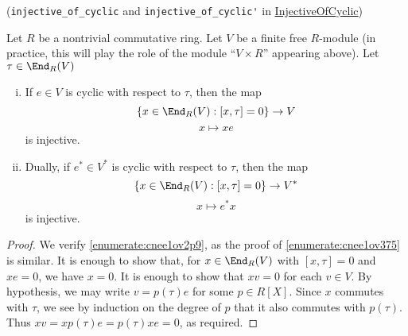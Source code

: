 \documentclass[reqno]{amsart} 
\begin{document}
\begin{lemma}
  (\verb|injective_of_cyclic| and \verb|injective_of_cyclic'| in \href{InjectiveOfCyclic.lean}{InjectiveOfCyclic})

  Let $R$ be a nontrivial commutative ring.  Let $V$ be a finite free $R$-module (in practice, this will play the role of the module ``$V \times R$'' appearing above).  Let $\tau \in \End_R(V)$

  \begin{enumerate}[(i)]
  \item\label{enumerate:cnee1ov2p9} If $e \in V$ is cyclic with respect to $\tau$, then the map
    \begin{equation*}
      \left\{ x \in \End_R(V) : [x,\tau] = 0 \right\} \rightarrow V
    \end{equation*}
    \begin{equation*}
      x \mapsto x e
    \end{equation*}
    is injective.
  \item\label{enumerate:cnee1ov375} Dually, if $e^* \in V^*$ is cyclic with respect to $\tau$, then the map
    \begin{equation*}
      \left\{ x \in \End_R(V) : [x,\tau] = 0 \right\} \rightarrow V^*
    \end{equation*}
    \begin{equation*}
      x \mapsto e^* x
    \end{equation*}
    is injective.
  \end{enumerate}
\end{lemma}
\begin{proof}
  We verify \eqref{enumerate:cnee1ov2p9}, as the proof of \eqref{enumerate:cnee1ov375} is similar.  It is enough to show that, for $x \in \End_R(V)$ with $[x,\tau] = 0$ and $x e = 0$, we have $x = 0$.  It is enough to show that $x v = 0$ for each $v \in V$.  By hypothesis, we may write $v = p(\tau) e$ for some $p \in R[X]$.  Since $x$ commutes with $\tau$, we see by induction on the degree of $p$ that it also commutes with $p(\tau)$.  Thus $x v = x p(\tau) e = p(\tau) x e = 0$, as required.
\end{proof}
\end{document}
